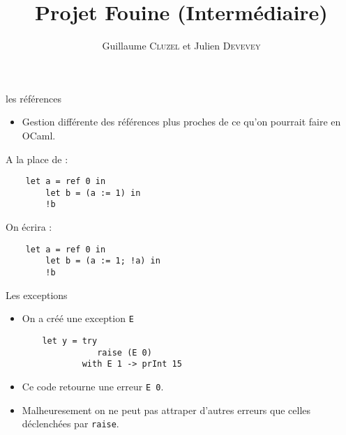 \documentclass[12pt]{beamer}
\author{Guillaume \textsc{Cluzel} et Julien \textsc{Devevey}}
\title{Projet Fouine (Intermédiaire)}
\begin{document}
\begin{frame}
\titlepage
\end{frame}


\begin{frame}[fragile]{les références}

  \begin{itemize}
  \item Gestion différente des références plus proches de ce qu'on pourrait faire en OCaml.
  \end{itemize}

A la place de :

\begin{verbatim}
    let a = ref 0 in
        let b = (a := 1) in
        !b
\end{verbatim}

On écrira :

\begin{verbatim}
    let a = ref 0 in
        let b = (a := 1; !a) in
        !b
\end{verbatim}


\end{frame}





\begin{frame}[fragile]{Les exceptions}
\begin{itemize}
\item On a créé une exception \texttt{E}
\begin{verbatim}
    let y = try
               raise (E 0)
            with E 1 -> prInt 15
\end{verbatim}

\item Ce code retourne une erreur \texttt{E 0}.

\item Malheuresement on ne peut pas attraper d'autres erreurs que celles déclenchées par \texttt{raise}.
\end{itemize}

\end{frame}
\end{document}
